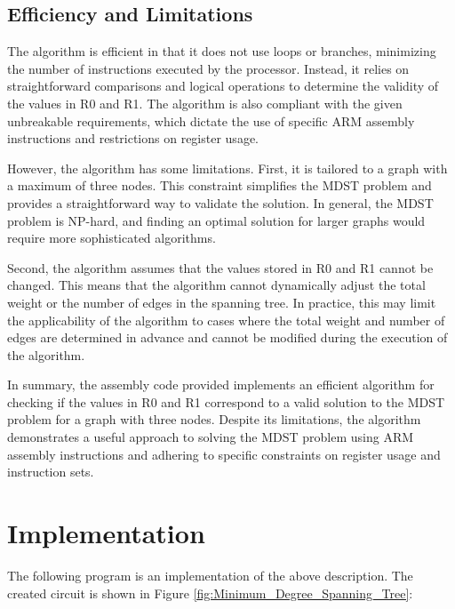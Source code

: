 \subsection{Efficiency and Limitations}

The algorithm is efficient in that it does not use loops or branches, minimizing the number of instructions executed by the processor. Instead, it relies on straightforward comparisons and logical operations to determine the validity of the values in R0 and R1. The algorithm is also compliant with the given unbreakable requirements, which dictate the use of specific ARM assembly instructions and restrictions on register usage.

However, the algorithm has some limitations. First, it is tailored to a graph with a maximum of three nodes. This constraint simplifies the MDST problem and provides a straightforward way to validate the solution. In general, the MDST problem is NP-hard, and finding an optimal solution for larger graphs would require more sophisticated algorithms.

Second, the algorithm assumes that the values stored in R0 and R1 cannot be changed. This means that the algorithm cannot dynamically adjust the total weight or the number of edges in the spanning tree. In practice, this may limit the applicability of the algorithm to cases where the total weight and number of edges are determined in advance and cannot be modified during the execution of the algorithm.

In summary, the assembly code provided implements an efficient algorithm for checking if the values in R0 and R1 correspond to a valid solution to the MDST problem for a graph with three nodes. Despite its limitations, the algorithm demonstrates a useful approach to solving the MDST problem using ARM assembly instructions and adhering to specific constraints on register usage and instruction sets.



\section{Implementation}

The following program is an implementation of the above description. The created circuit is shown in Figure \ref{fig:Minimum_Degree_Spanning_Tree}:

